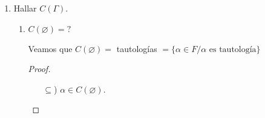 \begin{enumerate}
\begin{enumerate}
\begin{proof}
            Por otra parte,
            \begin{gather*}
                \dashbox{$v_f(p_3) = f(p_3) = 0$}
            \end{gather*}

            Entonces 
            \begin{gather*}
                \boxed{\alpha \notin C(\Gamma)}
            \end{gather*}

        \end{proof}


    \item $\Gamma = \{ p_1, p_2 \}$, $\alpha = \neg p_1$

        Veamos que $\alpha \notin C(\Gamma)$

        \begin{proof} \phantom{.}
        
            Defino $f: \mathrm{VAR}\to \{ 0,1 \}/ f(p_j) = 1$.

            Sea $v_f$ la valuación que extiende a $f$.

            \begin{gather*}
                v_f(p_1)=1 \wedge v_f(p_2) = 1 \implies v_f(\Gamma)=1
            \end{gather*}

            Pero $v_f(\alpha) = 1 - v_f(p_1) = 0$

            \begin{gather*}
                \boxed{\therefore ~ \alpha \notin C(\Gamma)}
            \end{gather*}
        \end{proof}
        
\end{enumerate}

\item Hallar $C(\Gamma)$.

\begin{enumerate}
    \item $C(\varnothing) = ?$

        Veamos que $C(\varnothing) = $ tautologías 
        $= \{ \alpha\in F /\alpha \text{ es tautología} \}$

        \begin{proof} \phantom{.}
        
            \begin{itemize}
                \item[$\subseteq$)] $\alpha \in C(\varnothing)$.


\end{itemize}
\end{proof}
\end{enumerate}
\end{enumerate}
